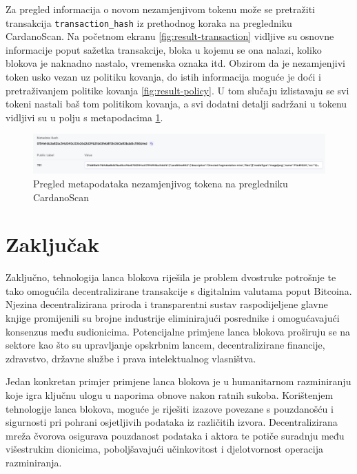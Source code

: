 \documentclass[times, utf8, diplomski]{fer}
\begin{document}
Za pregled informacija o novom nezamjenjivom tokenu može se pretražiti transakcija \texttt{transaction\_hash} iz prethodnog koraka na pregledniku CardanoScan. Na početnom ekranu \ref{fig:result-transaction} vidljive su osnovne informacije poput sažetka transakcije, bloka u kojemu se ona nalazi, koliko blokova je naknadno nastalo, vremenska oznaka itd. Obzirom da je nezamjenjivi token usko vezan uz politiku kovanja, do istih informacija moguće je doći i pretraživanjem politike kovanja \ref{fig:result-policy}. U tom slučaju izlistavaju se svi tokeni nastali baš tom politikom kovanja, a svi dodatni detalji sadržani u tokenu vidljivi su u polju s metapodacima \ref{fig:result-metadata}.

\begin{figure}[htb]
\centering
\includegraphics[width=\linewidth]{img/result-metadata.png}
\caption{Pregled metapodataka nezamjenjivog tokena na pregledniku CardanoScan}
\label{fig:result-metadata}
\end{figure}

\chapter{Zaključak}

Zaključno, tehnologija lanca blokova riješila je problem dvostruke potrošnje te tako omogućila decentralizirane transakcije s digitalnim valutama poput Bitcoina. Njezina decentralizirana priroda i transparentni sustav raspodijeljene glavne knjige promijenili su brojne industrije eliminirajući posrednike i omogućavajući konsenzus među sudionicima. Potencijalne primjene lanca blokova proširuju se na sektore kao što su upravljanje opskrbnim lancem, decentralizirane financije, zdravstvo, državne službe i prava intelektualnog vlasništva.

Jedan konkretan primjer primjene lanca blokova je u humanitarnom razminiranju koje igra ključnu ulogu u naporima obnove nakon ratnih sukoba. Korištenjem tehnologije lanca blokova, moguće je riješiti izazove povezane s pouzdanošću i sigurnosti pri pohrani osjetljivih podataka iz različitih izvora. Decentralizirana mreža čvorova osigurava pouzdanost podataka i aktora te potiče suradnju među višestrukim dionicima, poboljšavajući učinkovitost i djelotvornost operacija razminiranja.
\end{document}
